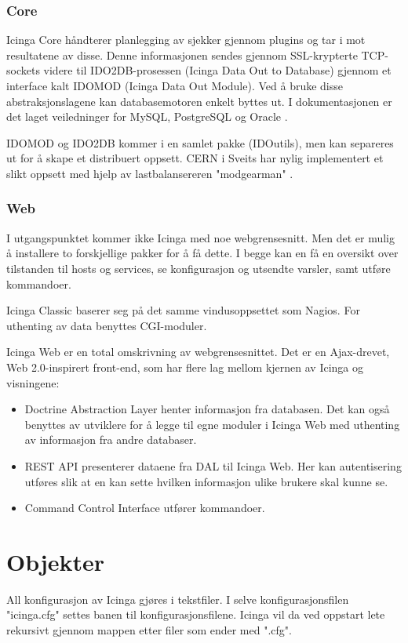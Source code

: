 \subsubsection{Core}
Icinga Core håndterer planlegging av sjekker gjennom plugins og tar i mot resultatene av disse. Denne informasjonen sendes gjennom SSL-krypterte TCP-sockets videre til IDO2DB-prosessen (Icinga Data Out to Database) gjennom et interface kalt IDOMOD (Icinga Data Out Module). Ved å bruke disse abstraksjonslagene kan databasemotoren enkelt byttes ut. I dokumentasjonen er det laget veiledninger for MySQL, PostgreSQL og Oracle \cite{icingaarchitecture}.

IDOMOD og IDO2DB kommer i en samlet pakke (IDOutils), men kan separeres ut for å skape et distribuert oppsett. CERN i Sveits har nylig implementert et slikt oppsett med hjelp av lastbalansereren "modgearman" \cite{cernthesis}.

\subsubsection{Web}\label{sec:teoriweb}
I utgangspunktet kommer ikke Icinga med noe webgrensesnitt. Men det er mulig å installere to forskjellige pakker for å få dette. I begge kan en få en oversikt over tilstanden til hosts og services, se konfigurasjon og utsendte varsler, samt utføre kommandoer.

Icinga Classic baserer seg på det samme vindusoppsettet som Nagios. For uthenting av data benyttes CGI-moduler.

Icinga Web er en total omskrivning av webgrensesnittet. Det er en Ajax-drevet, Web 2.0-inspirert front-end, som har flere lag mellom kjernen av Icinga og visningene:

\begin{itemize}
	\item Doctrine Abstraction Layer henter informasjon fra databasen. Det kan også benyttes av utviklere for å legge til egne moduler i Icinga Web med uthenting av informasjon fra andre databaser.
	\item REST API presenterer dataene fra DAL til Icinga Web. Her kan autentisering utføres slik at en kan sette hvilken informasjon ulike brukere skal kunne se.
	\item Command Control Interface utfører kommandoer.
\end{itemize}

\section{Objekter}\label{sec:objekter}
All konfigurasjon av Icinga gjøres i tekstfiler. I selve konfigurasjonsfilen "icinga.cfg" settes banen til konfigurasjonsfilene. Icinga vil da ved oppstart lete rekursivt gjennom mappen etter filer som ender med ".cfg".

